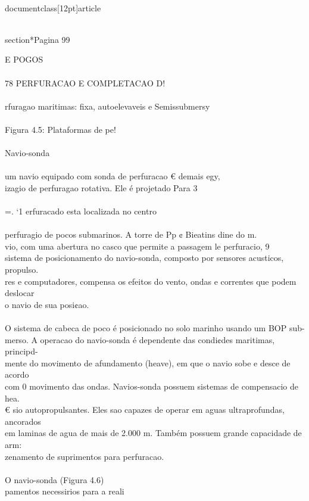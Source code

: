 \\documentclass[12pt]{article}
\begin{document}
\\section*{Pagina 99}

E POGOS\\
\\
78 PERFURACAO E COMPLETACAO D!\\
\\
rfuragao maritimas: fixa, autoelevaveis e Semissubmersy\\
\\
Figura 4.5: Plataformas de pe!\\
\\
Navio-sonda\\
\\
um navio equipado com sonda de perfuracao € demais egy,\\
izagio de perfuragao rotativa. Ele é projetado Para 3\\
\\
=. ‘1 erfuracado esta localizada no centro\\
\\
perfuragio de pocos submarinos. A torre de Pp ¢ Bieatins dine do m.\\
vio, com uma abertura no casco que permite a passagem le perfuracio, 9\\
sistema de posicionamento do navio-sonda, composto por sensores acusticos, propulso.\\
res e computadores, compensa os efeitos do vento, ondas e correntes que podem deslocar\\
o navio de sua posi¢ao.\\
\\
O sistema de cabeca de poco é posicionado no solo marinho usando um BOP sub-\\
merso. A operacao do navio-sonda é dependente das condi¢des maritimas, principd-\\
mente do movimento de afundamento (heave), em que o navio sobe e desce de acordo\\
com 0 movimento das ondas. Navios-sonda possuem sistemas de compensacio de hea.\\
€ sio autopropulsantes. Eles sao capazes de operar em aguas ultraprofundas, ancorados\\
em laminas de agua de mais de 2.000 m. Também possuem grande capacidade de arm:\\
zenamento de suprimentos para perfuracao.\\
\\
O navio-sonda (Figura 4.6)\\
pamentos necessirios para a reali\\
\end{document}
